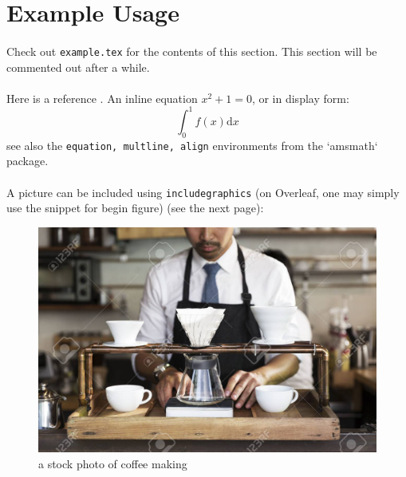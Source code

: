 \section{Example Usage}
\paragraph{}Check out \texttt{example.tex} for the contents of this section. This section will be commented out after a while.
\paragraph{}Here is a reference \cite{example2024}. An inline equation $x^2+1=0$, or in display form:
\[\int_0^1 f(x)\mathrm{d}x\]
see also the \texttt{equation, multline, align} environments from the `amsmath` package.
\paragraph{}A picture can be included using \texttt{includegraphics} (on Overleaf, one may simply use the snippet for begin figure) (see the next page):
\begin{center}
\begin{figure}
    \centering
    \includegraphics[scale=1]{media/coffee.jpg}
    \caption{a stock photo of coffee making}
    \label{fig:example}
\end{figure}
\end{center}
